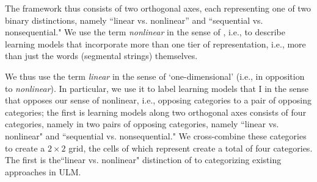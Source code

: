 %

The framework thus consists of two orthogonal axes, each representing one of two binary distinctions,
namely ``linear vs. nonlinear'' and ``sequential vs. nonsequential." 
We use the term \emph{nonlinear} in the sense of \citep{mccarthy:1981, goldsmith:1976}, i.e., 
to describe learning models that incorporate more than one tier of representation, i.e., more than 
just the words (segmental strings) themselves.

We thus use the term \emph{linear} in the sense of `one-dimensional' (i.e., in opposition to \emph{nonlinear}). 
In particular, we use it to label learning models that  I in the sense that opposes our sense of nonlinear, i.e., 
opposing categories to a pair of opposing categories; the first is learning models along two 
orthogonal axes consists of four categories, namely  in two pairs of opposing categories, namely 
``linear vs. nonlinear" and ``sequential vs. nonsequential." We cross-combine these categories 
to create a $2\times2$ grid, the cells of which represent create a total of four categories. 
The first is the``linear vs. nonlinear" distinction of \citep{mccarthy:1981, goldsmith:1976} 
to categorizing existing approaches in \ac{ULM}.

